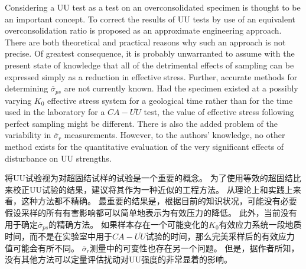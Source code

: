 \begin{paracol}{2}

    Considering a UU test as a test on an overconsolidated specimen is thought to be an important concept. To correct the results of UU tests by use of an equivalent overconsolidation ratio is proposed as an approximate engineering approach. There are both theoretical and practical reasons why such an approach is not precise. Of greatest consequence, it is probably unwarranted to assume with the present state of knowledge that all of the detrimental effects of sampling can be expressed simply as a reduction in effective stress. Further, accurate methods for determining $\overline{\sigma}_{ps}$ are not currently known. Had the specimen existed at a possibly varying $K_0$ effective stress system for a geological time rather than for the time used in the laboratory for a $CA-\overline{UU}$ test, the value of effective stress following perfect sampling might be different. There is also the added problem of the variability in $\overline{\sigma}_r$ measurements. However, to the authors' knowledge, no other method exists for the quantitative evaluation of the very significant effects of disturbance on UU strengths.

    \switchcolumn
        
    将UU试验视为对超固结试样的试验是一个重要的概念。 为了使用等效的超固结比来校正UU试验的结果，建议将其作为一种近似的工程方法。 从理论上和实践上来看，这种方法都不精确。 最重要的结果是，根据目前的知识状况，可能没有必要假设采样的所有有害影响都可以简单地表示为有效压力的降低。 此外，当前没有用于确定$\overline{\sigma}_{ps}$的精确方法。 如果样本存在一个可能变化的$K_0$有效应力系统一段地质时间，而不是在实验室中用于$CA-\overline{UU}$试验的时间，那么完美采样后的有效应力值可能会有所不同。 $\overline{\sigma}_r$测量中的可变性也存在另一个问题。 但是，据作者所知，没有其他方法可以定量评估扰动对UU强度的非常显着的影响。

\end{paracol}